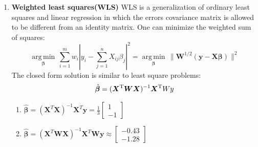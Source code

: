 \documentclass[12pt]{article}
\def \by{\boldsymbol{y}}
\def \bX{\boldsymbol{X}}
\def \bW{\boldsymbol{W}}
\begin{document}
\begin{enumerate}
    \item \textbf{Weighted least squares(WLS)} WLS is a generalization of ordinary least squares and linear regression in which the errors covariance matrix is allowed to be different from an identity matrix. One can minimize the weighted sum of squares:\\
        $$\underset{\boldsymbol \beta}{ \operatorname{arg\,min} }\, \sum_{i=1}^{m} w_i \left|y_i - \sum_{j=1}^{n} X_{ij}\beta_j\right|^2 = \underset{\boldsymbol \beta}{ \operatorname{arg\,min} } \, \big\|\bW^{1/2} (\mathbf y - \bX \boldsymbol \beta) \big\|^2$$
    The closed form solution is similar to least square problems:\\
        $$\hat{\boldsymbol{\beta}} = (\bX^{\rm T} \bW \bX)^{-1} \bX^{\rm T} W \mathbf \by$$
    
    \begin{enumerate}
    \item $\boldsymbol{\hat{\beta}} = (\bX^T \bX)^{-1}\bX^T\by = \frac{1}{3}\left [ \begin{matrix} 1 \\ -1 \end{matrix} \right ]$
    \item $\boldsymbol{\hat{\beta}} = (\bX^T \bW \bX)^{-1}\bX^T \bW \by \approx \left [ \begin{matrix} -0.43 \\ -1.28 \end{matrix} \right ]$
    \end{enumerate}


\end{enumerate}
\end{document}
